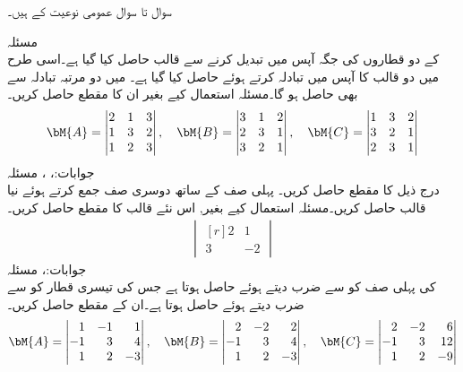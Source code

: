 
سوال  تا سوال  عمومی نوعیت کے ہیں۔

\quad مسئلہ \\
 کے دو قطاروں کی جگہ آپس میں تبدیل کرنے سے قالب  حاصل کیا گیا ہے۔اسی طرح  میں دو قالب کا آپس میں تبادلہ کرتے ہوئے  حاصل کیا گیا ہے۔ میں دو مرتبہ تبادلہ سے بھی  حاصل ہو گا۔مسئلہ  استعمال کیے بغیر ان کا مقطع حاصل کریں۔
\begin{align*}
\bM{A}=\begin{vmatrix} 2&1&3\\1&3&2\\1&2&3 \end{vmatrix},\quad \bM{B}=\begin{vmatrix} 3&1&2\\2&3&1\\3&2&1 \end{vmatrix},\quad \bM{C}=\begin{vmatrix}1&3&2\\3&2&1\\2&3&1 \end{vmatrix}
\end{align*}
جوابات:، ، 
مسئلہ \\
درج ذیل کا مقطع حاصل کریں۔ پہلی صف کے ساتھ دوسری صف جمع کرتے ہوئے نیا قالب حاصل کریں۔مسئلہ  استعمال کیے بغیر, اس نئے قالب کا مقطع  حاصل کریں۔
\begin{align*}
\begin{vmatrix*}[r]
2&1\\3&-2
\end{vmatrix*}
\end{align*}
جوابات:، 
مسئلہ \\
 کی پہلی صف کو  سے ضرب دیتے ہوئے  حاصل ہوتا ہے جس کی تیسری قطار کو  سے ضرب دیتے ہوئے  حاصل ہوتا ہے۔ان کے مقطع حاصل کریں۔
\begin{align*}
\bM{A}=\begin{vmatrix*}[r] 1&-1&1\\-1&3&4\\1&2&-3 \end{vmatrix*}, \quad \bM{B}=\begin{vmatrix*}[r] 2&-2&2\\-1&3&4\\1&2&-3 \end{vmatrix*}, \quad \bM{C}=\begin{vmatrix*}[r] 2&-2&6\\-1&3&12\\1&2&-9 \end{vmatrix*}
\end{align*}
